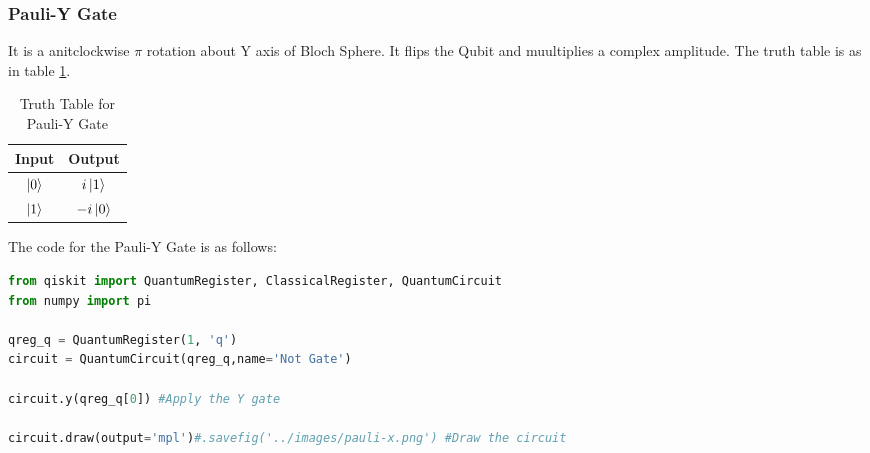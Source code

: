 \subsubsection{Pauli-Y Gate}
It is a anitclockwise $\pi$ rotation about Y axis of Bloch Sphere. 
It flips the Qubit and muultiplies a complex amplitude. The truth table is as in table \ref{tab:pauli-y}.
\begin{table}[ht]
    \centering
    \begin{tabular}{|c|c|}
        \hline
        Input & Output\\
        \hline
        $\ket{0}$ & $i\ket{1}$\\
        $\ket{1}$ & $-i\ket{0}$\\
        \hline
    \end{tabular}
    \caption{Truth Table for Pauli-Y Gate}
    \label{tab:pauli-y}
\end{table}
The code for the Pauli-Y Gate is as follows:
\begin{lstlisting}[language=Python]
from qiskit import QuantumRegister, ClassicalRegister, QuantumCircuit
from numpy import pi

qreg_q = QuantumRegister(1, 'q')
circuit = QuantumCircuit(qreg_q,name='Not Gate')

circuit.y(qreg_q[0]) #Apply the Y gate

circuit.draw(output='mpl')#.savefig('../images/pauli-x.png') #Draw the circuit
\end{lstlisting}

